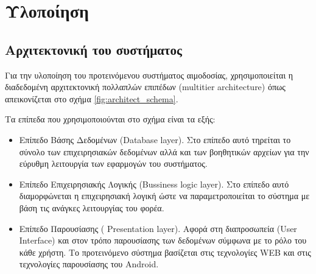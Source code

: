 \graphicspath{ {Figures/implementation/} }

\chapter{Υλοποίηση}\label{ch:Implementation}

\section{Αρχιτεκτονική του συστήματος}
Για την υλοποίηση του προτεινόμενου συστήματος αιμοδοσίας, χρησιμοποιείται η διαδεδομένη αρχιτεκτονική πολλαπλών επιπέδων (multitier architecture) όπως απεικονίζεται στο σχήμα \ref{fig:architect_schema}.

	Τα επίπεδα που χρησιμοποιούνται στο σχήμα είναι τα εξής:
	\begin{itemize}
	\item Επίπεδο Βάσης Δεδομένων (Database layer). Στο επίπεδο αυτό τηρείται το σύνολο των επιχειρησιακών δεδομένων αλλά και των βοηθητικών αρχείων για την εύρυθμη λειτουργία των εφαρμογών του συστήματος.
	
	\item  Επίπεδο Επιχειρησιακής Λογικής (Bussiness logic layer). Στο επίπεδο αυτό διαμορφώνεται η επιχειρησιακή λογική ώστε να παραμετροποιείται το σύστημα με βάση τις ανάγκες λειτουργίας του φορέα.
	
	\item Επίπεδο Παρουσίασης ( Presentation layer). Αφορά στη διαπροσωπεία (User Interface) και στον τρόπο παρουσίασης των δεδομένων σύμφωνα με το ρόλο του κάθε χρήστη. Το προτεινόμενο σύστημα βασίζεται στις τεχνολογίες WEB και στις τεχνολογίες παρουσίασης του Android.
	
	\end{itemize}

